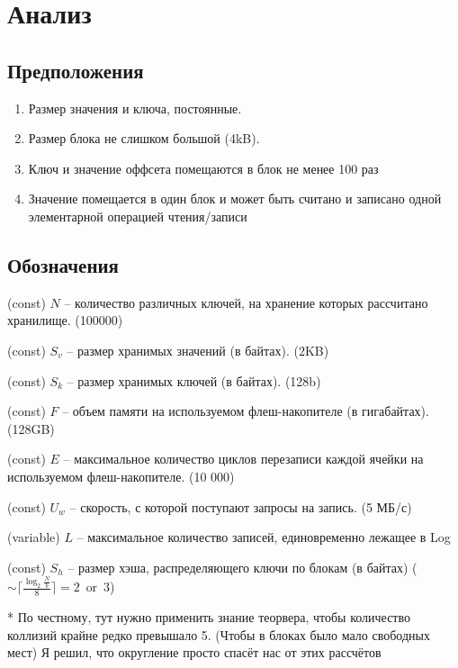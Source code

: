 \section*{Анализ}

\subsection*{Предположения}
\begin{enumerate}
	\item Размер значения и ключа, постоянные.
	
	\item Размер блока не слишком большой (4kB).
	
	\item Ключ и значение оффсета помещаются в блок не менее 100 раз
	
	\item Значение помещается в один блок и может быть считано и записано одной элементарной операцией чтения/записи
	
\end{enumerate}

\subsection*{Обозначения}

(const) $N$ -- количество различных ключей, на хранение которых рассчитано хранилище. (100000)

(const) $S_v$ -- размер хранимых значений (в байтах). (2KB)

(const) $S_k$ -- размер хранимых ключей (в байтах). (128b)

(const) $F$ -- объем памяти на используемом флеш-накопителе (в гигабайтах). (128GB)

(const) $E$ -- максимальное количество циклов перезаписи каждой ячейки на используемом флеш-накопителе. (10 000)

(const) $U_w$ -- скорость, с которой поступают запросы на запись. (5 МБ/с)

(variable) $L$ -- максимальное количество записей, единовременно лежащее в Log

(const) $S_h$ -- размер хэша, распределяющего ключи по блокам (в байтах) ($\sim\lceil\frac{\log_2 \frac{N}{b}}{8}\rceil = 2\ \operatorname{or}\ 3$)

* По честному, тут нужно применить знание теорвера, чтобы количество коллизий крайне редко превышало 5. (Чтобы в блоках было мало свободных мест) Я решил, что округление просто спасёт нас от этих рассчётов

